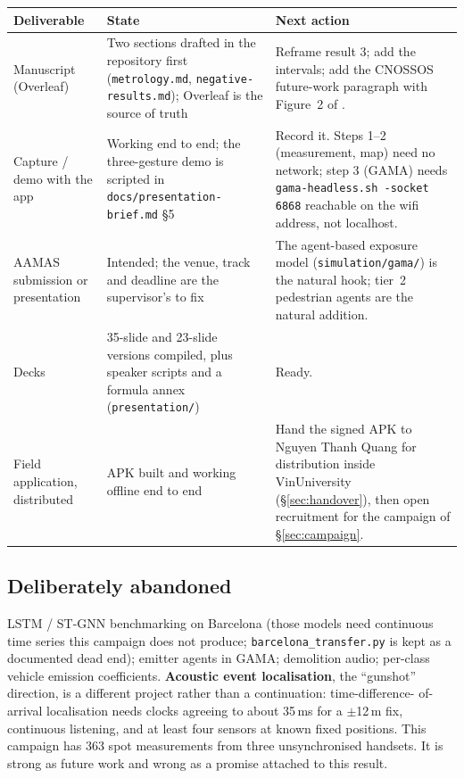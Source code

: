 \documentclass[11pt,a4paper]{article}
\newcommand{\pth}[1]{\texttt{\small #1}}
\begin{document}
\begin{center}\small
\begin{tabular}{@{}p{4.2cm}p{4.2cm}p{5.4cm}@{}}
\toprule
\textbf{Deliverable} & \textbf{State} & \textbf{Next action} \\
\midrule
Manuscript (Overleaf) & Two sections drafted in the repository first
 (\pth{metrology.md}, \pth{negative-results.md}); Overleaf is the source of
 truth & Reframe result 3; add the intervals; add the CNOSSOS future-work
 paragraph with Figure~2 of \citet{bocher2019noisemodelling}. \\
Capture / demo with the app & Working end to end; the three-gesture demo is
 scripted in \pth{docs/presentation-brief.md} §5 & Record it. Steps 1--2
 (measurement, map) need no network; step 3 (GAMA) needs
 \pth{gama-headless.sh -socket 6868} reachable on the wifi address, not
 localhost. \\
AAMAS submission or presentation & Intended; the venue, track and deadline are
 the supervisor's to fix & The agent-based exposure model
 (\pth{simulation/gama/}) is the natural hook; tier~2 pedestrian agents are the
 natural addition. \\
Decks & 35-slide and 23-slide versions compiled, plus speaker scripts and a
 formula annex (\pth{presentation/}) & Ready. \\
Field application, distributed & APK built and working offline end to end &
 Hand the signed APK to Nguyen Thanh Quang for distribution inside
 VinUniversity (§\ref{sec:handover}), then open recruitment for the campaign
 of §\ref{sec:campaign}. \\
\bottomrule
\end{tabular}
\end{center}

\subsection{Deliberately abandoned}

LSTM / ST-GNN benchmarking on Barcelona (those models need continuous time
series this campaign does not produce; \pth{barcelona\_transfer.py} is kept as a
documented dead end); emitter agents in GAMA; demolition audio; per-class vehicle
emission coefficients. \textbf{Acoustic event localisation}, the ``gunshot''
direction, is a different project rather than a continuation: time-difference-
of-arrival localisation needs clocks agreeing to about 35\,ms for a $\pm$12\,m
fix, continuous listening, and at least four sensors at known fixed positions.
This campaign has 363 spot measurements from three unsynchronised handsets. It is
strong as future work and wrong as a promise attached to this result.
\end{document}
